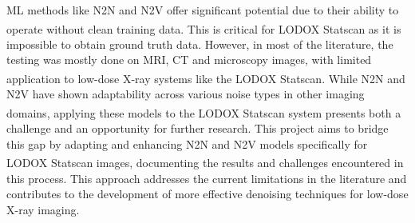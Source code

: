 \gls{ML} methods like \gls{N2N} and \gls{N2V} offer significant potential due to their ability to operate without clean training data. This is critical for LODOX\textsuperscript{\textregistered} Statscan\textsuperscript{\textregistered} as it is impossible to obtain ground truth data. However, in most of the literature, the testing was mostly done on \gls{MRI}, \gls{CT} and microscopy images, with limited application to low-dose X-ray systems like the LODOX\textsuperscript{\textregistered} Statscan\textsuperscript{\textregistered}. While \gls{N2N} and \gls{N2V} have shown adaptability across various noise types in other imaging domains, applying these models to the LODOX\textsuperscript{\textregistered} Statscan\textsuperscript{\textregistered} system presents both a challenge and an opportunity for further research. This project aims to bridge this gap by adapting and enhancing \gls{N2N} and \gls{N2V} models specifically for LODOX\textsuperscript{\textregistered} Statscan\textsuperscript{\textregistered} images, documenting the results and challenges encountered in this process. This approach addresses the current limitations in the literature and contributes to the development of more effective denoising techniques for low-dose X-ray imaging.

